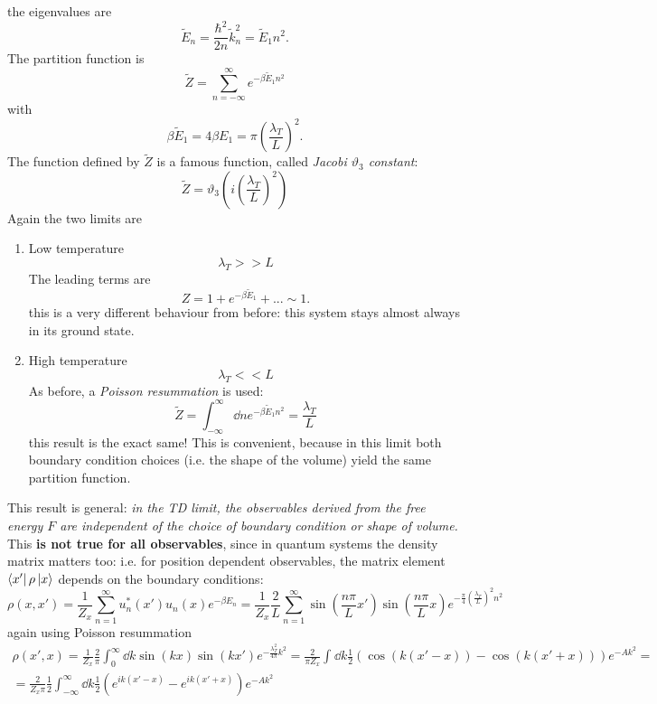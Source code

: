 the eigenvalues are
\[
    \tilde E_n = \frac{\hbar ^2}{2n}\tilde k_n^2 = \tilde E_1 n^2.
\]      
The partition function is
\[
    \tilde Z=\sum_{n=-\infty}^{\infty} e^{-\beta\tilde E_1 n^2}
\]
with
\[
    \beta\tilde E_1 = 4\beta E_1 = \pi\left(\frac{\lambda_T}{L}\right)^2.
\]
The function defined by $\tilde Z$ is a famous function, called \textit{Jacobi
$\vartheta_3$ constant}:
\[
    \tilde Z = \vartheta_3\left(i\left(\frac{\lambda_T}{L}\right)^2\right)
\]
Again the two limits are
\begin{enumerate}
    \item Low temperature
        \[
            \lambda_T>>L
        \]
    The leading terms are
        \[
            Z= 1+e^{-\beta\tilde E_1}+... \sim 1.
        \]
    this is a very different behaviour from before: this system stays almost
    always in its ground state.
    \item High temperature
        \[
            \lambda_T<<L
        \]
    As before, a \textit{Poisson resummation} is used:
    \[
        \tilde Z = \int_{-\infty}^{\infty} \dd n e^{-\beta\tilde E_1n^2}=
        \frac{\lambda_T}{L}
    \]
    this result is the exact same! This is convenient, because in this limit both
    boundary condition choices (i.e. the shape of the volume) yield the same
    partition function.
\end{enumerate}
This result is general: \textit{in the TD limit, the observables derived from the
free energy $F$ are independent of the choice of boundary condition or shape of
volume.}\\
This \textbf{is not true for all observables}, since in quantum systems
the density matrix matters too: i.e. for position dependent observables, the
matrix element $\bra{x'}\rho\ket{x}$ depends on the boundary conditions:
\[
    \rho(x,x') = \frac{1}{Z_x}\sum_{n=1}^{\infty} u^*_n(x')u_n(x)e^{-\beta E_n}=
    \frac{1}{Z_x}\frac{2}{L}\sum_{n=1}^{\infty} \sin\left(\frac{n\pi}{L}x'\right)
    \sin\left(\frac{n\pi}{L}x\right)e^{-\frac{\pi}{4}\left(\frac{\lambda_T}{L}
    \right)^2n^2}
\]
again using Poisson resummation
\begin{gather*}
    \rho(x',x)=\frac{1}{Z_x}\frac{2}{\pi}\int_{0}^{\infty} \dd k \sin(kx)\sin(kx')
    e^{-\frac{\lambda_T^2}{4\pi}k^2}=\frac{2}{\pi Z_x}\int_{}^{} \dd k
    \frac{1}{2}\left(\cos\left(k(x'-x)\right)-\cos\left(k(x'+x)\right)\right)
    e^{-Ak^2}=\\
    =\frac{2}{Z_x\pi}\frac{1}{2}\int_{-\infty}^{\infty} \dd k
    \frac{1}{2}\left(e^{ik(x'-x)}-e^{ik(x'+x)}\right)e^{-Ak^2}
\end{gather*}
